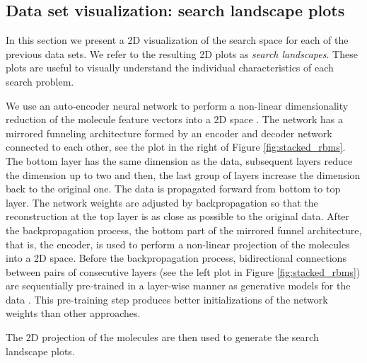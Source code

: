 \subsection{Data set visualization: search landscape plots}

In this section we present a 2D visualization of the search space for each of
the previous data sets. We refer to the resulting 2D plots as \emph{search
landscapes}. These plots are useful to visually understand the individual
characteristics of each search problem. 

We use an
auto-encoder neural network to perform a non-linear dimensionality reduction of the molecule feature vectors
into a 2D space \cite{Hinton_2006}. The network has a mirrored
funneling architecture formed by an encoder and decoder network connected to
each other, see the plot in the
right of Figure \ref{fig:stacked_rbms}. The bottom layer has the same dimension as the data, subsequent
layers reduce the dimension up to two and then, the last group of layers
increase the dimension back to the original one. 
The data is propagated forward from bottom to top layer. The network
weights are adjusted by backpropagation so that the reconstruction at the top
layer is as close as possible to the original data. After
the backpropagation process, the bottom part of the mirrored funnel architecture, that is, the
encoder, is used to perform a non-linear projection of the molecules into a 2D
space. Before the backpropagation process, bidirectional
connections between pairs of consecutive layers (see the left plot in Figure
\ref{fig:stacked_rbms}) are sequentially pre-trained in a layer-wise manner as
generative models for the data \cite{Hinton_2006}. This pre-training step
produces better initializations of the network weights than other approaches.

The 2D projection of the molecules are then used to generate the search
landscape plots.

